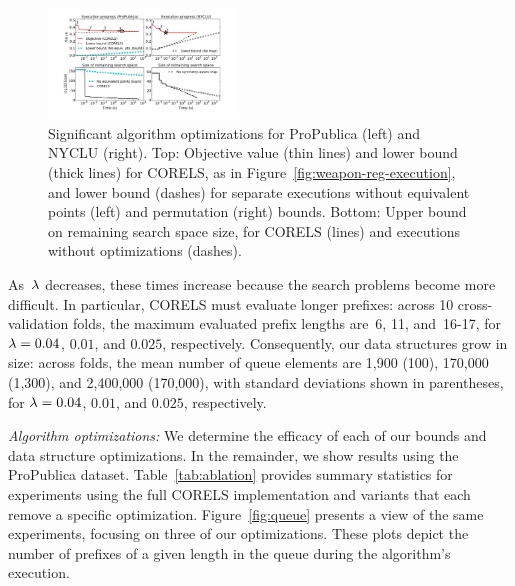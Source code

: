 \begin{figure}[t!]
\begin{center}
\includegraphics[trim={30mm 15mm 35mm 5mm}, width=0.45\textwidth]{figs/weapon_execution-remaining-space.pdf}
\end{center}
\vspace{-2mm}
\caption{Significant algorithm optimizations
for ProPublica (left) and NYCLU (right).
%
Top: Objective value (thin lines) and lower bound (thick lines) for CORELS,
as in Figure~\ref{fig:weapon-reg-execution},
and lower bound (dashes) for separate executions without
equivalent points (left) and permutation (right) bounds.
%
Bottom: Upper bound on remaining search space size,
for CORELS (lines) and executions without optimizations (dashes).
}
\label{fig:objective}
\end{figure}

As~${\lambda}$ decreases, these times increase because the search problems become more difficult.
%
In particular, CORELS must evaluate longer prefixes:
across 10 cross-validation folds, the maximum evaluated prefix lengths are~6,
11, and~16-17, for ${{\lambda} = 0.04}$, $0.01$, and $0.025$, respectively.
%
Consequently, our data structures grow in size: \eg
across folds, the mean number of queue elements are
1,900 (100), 170,000 (1,300), and 2,400,000 (170,000),
with standard deviations shown in parentheses,
for ${{\lambda} = 0.04}$, $0.01$, and $0.025$, respectively.


\textit{Algorithm optimizations:}
We determine the efficacy of each of our bounds and data structure optimizations.
%
In the remainder, we show results using the ProPublica dataset.
%
Table~\ref{tab:ablation} provides summary statistics for experiments using
the full CORELS implementation and variants that each remove a specific optimization.
%
Figure~\ref{fig:queue} presents a view of the same experiments, focusing
on three of our optimizations. These plots depict the number of
prefixes of a given length in the queue during the algorithm's execution.

